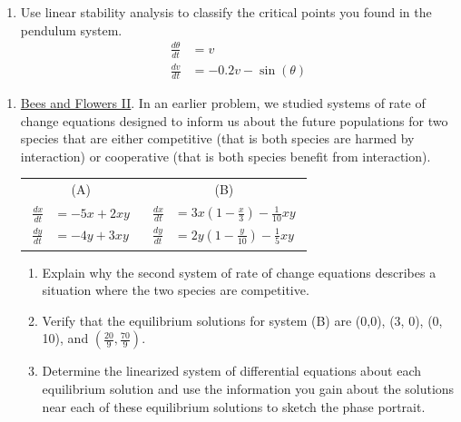 \begin{enumerate}[resume]
\item Use linear stability analysis to classify the critical points you found in the pendulum system. \label{14problem13}
\begin{align*}
\frac{d\theta}{dt} &=v \\
\frac{dv}{dt} &= -0.2v - \sin(\theta)
\end{align*}
\vfill

\end{enumerate}

\clearpage


\begin{enumerate}
\item \underline{Bees and Flowers II}. In an earlier problem, we studied systems of rate of change equations designed to inform us about the future populations for two species that are either competitive (that is both species are harmed by interaction) or cooperative (that is both species benefit from interaction). \label{14HWproblem1}

\begin{center}
\begin{tabular}{cc}
	 (A)	&	(B)	\\
$\displaystyle \begin{aligned} \frac{dx}{dt} &= -5x+2xy\\ \frac{dy}{dt} &= -4y+3xy \end{aligned}$ &$\displaystyle \begin{aligned} \frac{dx}{dt} &= 3x(1-\frac{x}{3})-\frac{1}{10}xy\\ \frac{dy}{dt} &= 2y(1-\frac{y}{10})-\frac{1}{5}xy \end{aligned}$ 
\end{tabular}
\end{center}

\begin{enumerate}
\item Explain why the second system of rate of change equations describes a situation where the two species are competitive. \label{14HWproblem1parta}
\item Verify that the equilibrium solutions for system (B) are (0,0), (3, 0), (0, 10), and $(\frac{20}{9},\frac{70}{9})$. \label{14HWproblem1partb}
\item Determine the linearized system of differential equations about each equilibrium solution and use the information you gain about the solutions near each of these equilibrium solutions to sketch the phase portrait. \label{14HWproblem1partc}
\end{enumerate}


\end{enumerate}
